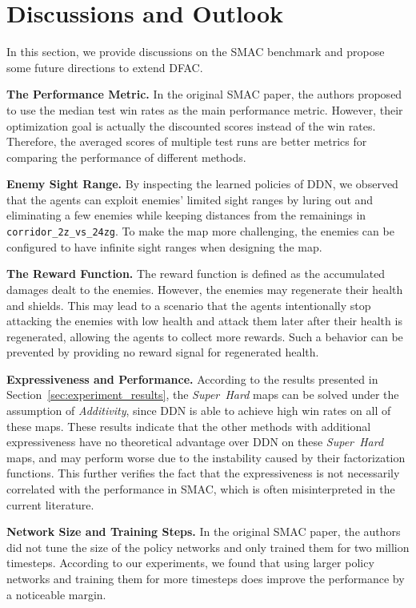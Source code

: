 \documentclass[twoside,11pt]{article}
\newcommand{\superhard}{\textit{Super~Hard}}
\newcommand{\additivity}{\textit{Additivity}}
\newcommand{\ddn}{DDN}
\begin{document}
 \section{Discussions and Outlook}

In this section, we provide discussions on the SMAC benchmark and propose some future directions to extend DFAC.

\textbf{The Performance Metric.} In the original SMAC paper, the authors proposed to use the median test win rates as the main performance metric. However, their optimization goal is actually the discounted scores instead of the win rates. Therefore, the averaged scores of multiple test runs are better metrics for comparing the performance of different methods.

\textbf{Enemy Sight Range.} By inspecting the learned policies of \ddn{}, we observed that the agents can exploit enemies' limited sight ranges by luring out and eliminating a few enemies while keeping distances from the remainings in \texttt{corridor\_2z\_vs\_24zg}. To make the map more challenging, the enemies can be configured to have infinite sight ranges when designing the map.

\textbf{The Reward Function.} The reward function is defined as the accumulated damages dealt to the enemies. However, the enemies may regenerate their health and shields. This may lead to a scenario that the agents intentionally stop attacking the enemies with low health and attack them later after their health is regenerated, allowing the agents to collect more rewards. Such a behavior can be prevented by providing no reward signal for regenerated health.

\textbf{Expressiveness and Performance.} 
According to the results presented in Section~\ref{sec:experiment_results}, the \superhard{} maps can be solved under the assumption of \additivity{}, since \ddn{} is able to achieve high win rates on all of these maps.
These results indicate that the other methods with additional expressiveness have no theoretical advantage over \ddn{} on these \superhard{} maps, and may perform worse due to the instability caused by their factorization functions. This further verifies the fact that the expressiveness is not necessarily correlated with the performance in SMAC, which is often misinterpreted in the current literature.

\textbf{Network Size and Training Steps.} 
In the original SMAC paper, the authors did not tune the size of the policy networks and only trained them for two million timesteps. According to our experiments, we found that using larger policy networks and training them for more timesteps does improve the performance by a noticeable margin.
\end{document}
